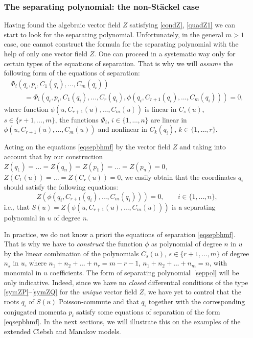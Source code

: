 \documentclass[10pt,a4paper]{amsart}
\numberwithin{equation}{section}
\begin{document}
\subsubsection{The separating polynomial: the non-St\"ackel case}
Having found the algebraic vector field $Z$ satisfying \eqref{condZ}, \eqref{quadZ1} we can start to look for the separating polynomial. Unfortunately, in the general $m>1$ case, one cannot construct the formula for the separating polynomial with the help of only one vector field $Z$. One can proceed in a systematic way only for certain types of the equations
of separation. That is why we will {\it assume} the following form of the equations of separation:
\begin{gather}
\Phi_{i}(q_i,p_i, C_1(q_i),\dots ,C_m(q_i))\nonumber\\
\qquad{} = \Phi_{i}(q_i,p_i, C_1(q_i),\dots ,C_r(q_i), \phi(q_i,C_{r+1}(q_i),\dots ,C_m(q_i)))
 =0,\label{eqsepbhmf}
\end{gather}
where function $\phi(u,C_{r+1}(u), \dots ,C_m(u))$ is linear in $C_{s}(u)$, $s\in \{r+1,\dots, m\}$, the functions $\Phi_{i}$, $i\in \{1, \dots,n \}$ are linear in $\phi(u,C_{r+1}(u), \dots ,C_m(u))$ and nonlinear in $C_k(q_i)$, $k\in \{1, \dots, r \}$.

Acting on the equations \eqref{eqsepbhmf} by the vector field $Z$ and taking into account that by our construction $Z(q_1)= \dots =Z(q_n)= Z(p_1)= \dots =Z(p_n)=0$, $Z(C_1(u))= \dots =Z(C_r(u))=0$,
we easily obtain that the coordinates $q_i$ should satisfy the following equations:
\begin{equation}\label{seppol}
Z(\phi(q_i,C_{r+1}(q_i), \dots ,C_m(q_i)))=0, \qquad i\in \{1, \dots, n\},
\end{equation}
i.e., that $S(u)=Z(\phi(u,C_{r+1}(u), \dots ,C_m(u)))$ is a separating polynomial in $u$ of degree $n$.

\begin{Remark}
In practice, we do not know a priori the equations of separation \eqref{eqsepbhmf}. That is why we have to {\it construct} the function $\phi$ as polynomial of degree $n$ in $u$ by the linear combination of the polynomials $C_{s}(u)$, $s\in \{r+1, \dots, m \}$ of degree $n_s$ in $u$, where
 $n_1+n_2+ \dots +n_r=m-r-1$, $n_1+n_2+ \dots +n_m=n$, with monomial in $u$ coefficients.
The form of separating polynomial~\eqref{seppol} will be only indicative. Indeed, since we have no {\it closed} differential conditions of the type \eqref{symZP}--\eqref{symZQ} for the {\it unique} vector field $Z$, we have yet to control that the roots $q_i$ of $S(u)$ Poisson-commute and that $q_i$ together with the corresponding conjugated momenta $p_i$ satisfy some equations of separation of the form \eqref{eqsepbhmf}. In the next sections, we will illustrate this on the examples of the extended Clebsh and Manakov models.
\end{Remark}
\end{document}
